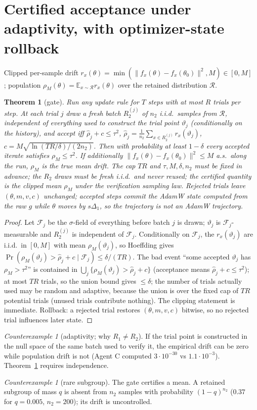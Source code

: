 \documentclass[11pt]{article}
\newtheorem{theorem}[proposition]{Theorem}
\theoremstyle{remark}
\newtheorem{counterexample}[proposition]{Counterexample}
\begin{document}
\section{Certified acceptance under adaptivity, with optimizer-state rollback}
Clipped per-sample drift $r_x(\theta)=\min(\|f_x(\theta)-f_x(\theta_0)\|^2,M)\in[0,M]$; population
$\rho_M(\theta)=\mathbb{E}_{x\sim\mathcal R}r_x(\theta)$ over the retained distribution $\mathcal R$.
\begin{theorem}[gate]\label{t:gate}
Run any update rule for $T$ steps with at most $R$ trials per step. At each trial $j$ draw a fresh batch $R_2^{(j)}$ of
$n_2$ i.i.d.\ samples from $\mathcal R$, independent of everything used to construct the trial point $\vartheta_j$
(conditionally on the history), and accept iff $\hat\rho_j+c\le\tau^2$, $\hat\rho_j=\frac1{n_2}\sum_{x\in R_2^{(j)}}r_x(\vartheta_j)$,
$c=M\sqrt{\ln(TR/\delta)/(2n_2)}$. Then with probability at least $1-\delta$ every accepted iterate satisfies
$\rho_M\le\tau^2$. If additionally $\|f_x(\theta)-f_x(\theta_0)\|^2\le M$ a.s.\ along the run, $\rho_M$ is the true mean drift.
The cap $TR$ and $\tau,M,\delta,n_2$ must be fixed in advance; the $R_2$ draws must be fresh i.i.d.\ and never reused; the certified quantity is the clipped mean $\rho_M$ under the verification sampling law. Rejected trials leave $(\theta,m,v,c)$ unchanged; accepted steps commit the AdamW state computed from the raw $g$ while $\theta$ moves by $s\Delta_1$, so the trajectory is \emph{not} an AdamW trajectory.
\end{theorem}
\begin{proof}
Let $\mathcal F_{j}$ be the $\sigma$-field of everything before batch $j$ is drawn; $\vartheta_j$ is $\mathcal F_j$-measurable
and $R_2^{(j)}$ is independent of $\mathcal F_j$. Conditionally on $\mathcal F_j$, the $r_x(\vartheta_j)$ are i.i.d.\ in $[0,M]$ with
mean $\rho_M(\vartheta_j)$, so Hoeffding gives $\Pr(\rho_M(\vartheta_j)>\hat\rho_j+c\mid\mathcal F_j)\le\delta/(TR)$. The bad
event ``some accepted $\vartheta_j$ has $\rho_M>\tau^2$'' is contained in $\bigcup_j\{\rho_M(\vartheta_j)>\hat\rho_j+c\}$ (acceptance
means $\hat\rho_j+c\le\tau^2$); at most $TR$ trials, so the union bound gives $\le\delta$; the number of trials actually used may be random and adaptive, because the union is over the fixed cap of $TR$ potential trials (unused trials contribute nothing). The clipping statement is immediate.
Rollback: a rejected trial restores $(\theta,m,v,c)$ bitwise, so no rejected trial influences later state.
\end{proof}
\begin{counterexample}[adaptivity; why $R_1\ne R_2$] If the trial point is constructed in the null space of the same
batch used to verify it, the empirical drift can be zero while population drift is not (Agent C computed $3\cdot10^{-30}$
vs $1.1\cdot10^{-3}$). Theorem~\ref{t:gate} requires independence.\end{counterexample}
\begin{counterexample}[rare subgroup] The gate certifies a mean. A retained subgroup of mass $q$ is absent from
$n_2$ samples with probability $(1-q)^{n_2}$ ($0.37$ for $q=0.005$, $n_2=200$); its drift is uncontrolled.\end{counterexample}
\end{document}
